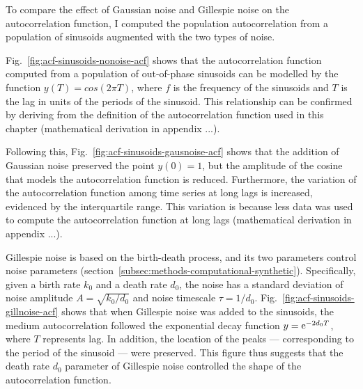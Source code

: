 To compare the effect of Gaussian noise and Gillespie noise on the autocorrelation function, I computed the population autocorrelation from a population of sinusoids augmented with the two types of noise.


Fig.\ \ref{fig:acf-sinusoids-nonoise-acf} shows that the autocorrelation function computed from a population of out-of-phase sinusoids can be modelled by the function $y(T) = cos(2 \pi T)$, where $f$ is the frequency of the sinusoids and $T$ is the lag in units of the periods of the sinusoid.
This relationship can be confirmed by deriving from the definition of the autocorrelation function used in this chapter (mathematical derivation in appendix ...).

Following this, Fig.\ \ref{fig:acf-sinusoids-gausnoise-acf} shows that the addition of Gaussian noise preserved the point $y(0) = 1$, but the amplitude of the cosine that models the autocorrelation function is reduced.
Furthermore, the variation of the autocorrelation function among time series at long lags is increased, evidenced by the interquartile range.
This variation is because less data was used to compute the autocorrelation function at long lags (mathematical derivation in appendix ...).

Gillespie noise is based on the birth-death process, and its two parameters control noise parameters (section~\ref{subsec:methods-computational-synthetic}).
Specifically, given a birth rate $k_{0}$ and a death rate $d_{0}$, the noise has a standard deviation of noise amplitude $A = \sqrt{k_{0}/d_{0}}$ and noise timescale $\tau = 1/d_{0}$.
Fig.\ \ref{fig:acf-sinusoids-gillnoise-acf} shows that when Gillespie noise was added to the sinusoids, the medium autocorrelation followed the exponential decay function $y = \mathrm{e}^{-2d_{0}T}$, where $T$ represents lag.
In addition, the location of the peaks --- corresponding to the period of the sinusoid --- were preserved.
This figure thus suggests that the death rate $d_{0}$ parameter of Gillespie noise controlled the shape of the autocorrelation function.


